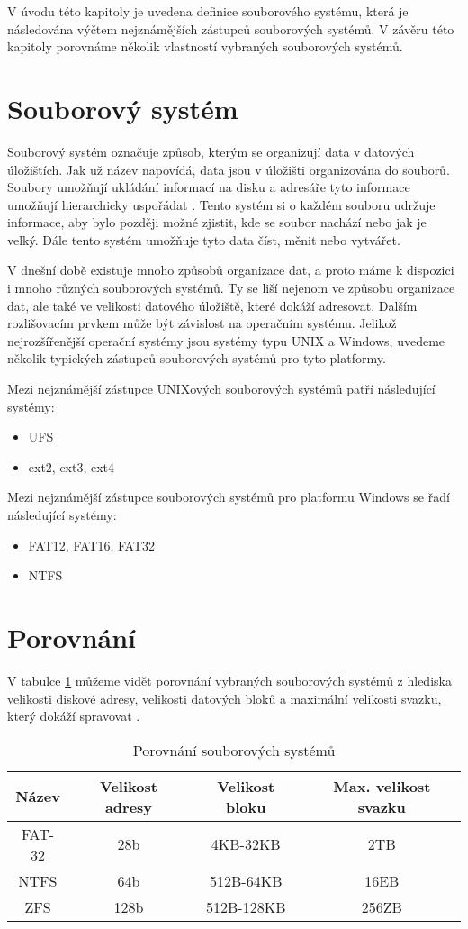 V úvodu této kapitoly je uvedena definice souborového systému, která je následována výčtem nejznámějších zástupců souborových systémů. V závěru této kapitoly porovnáme několik vlastností vybraných souborových systémů.
\section{Souborový systém}
    \label{fs}
    Souborový systém označuje způsob, kterým se organizují data v datových úložištích. Jak už název napovídá, data jsou v úložišti organizována do souborů. Soubory umožňují ukládání informací na disku a adresáře tyto informace umožňují hierarchicky uspořádat \cite{fs}. Tento systém si o každém souboru udržuje informace, aby bylo později možné zjistit, kde se soubor nachází nebo jak je velký. Dále tento systém umožňuje tyto data číst, měnit nebo vytvářet.

    V dnešní době existuje mnoho způsobů organizace dat, a proto máme k dispozici i mnoho různých souborových systémů. Ty se liší nejenom ve způsobu organizace dat,
    ale také ve velikosti datového úložiště, které dokáží adresovat. Dalším rozlišovacím prvkem může být závislost na operačním systému.
    Jelikož nejrozšířenější operační systémy jsou systémy typu UNIX a Windows, uvedeme několik typických zástupců souborových systémů pro tyto platformy.

    Mezi nejznámější zástupce UNIXových souborových systémů patří následující systémy:
    \begin{itemize}
      \item UFS
      \item ext2, ext3, ext4
    \end{itemize}

    Mezi nejznámější zástupce souborových systémů pro platformu Windows se řadí následující systémy:
    \begin{itemize}
      \item FAT12, FAT16, FAT32
      \item NTFS
    \end{itemize}

\section{Porovnání}
    V tabulce \ref{fscompare} můžeme vidět porovnání vybraných souborových systémů z hlediska velikosti diskové adresy, velikosti datových bloků a maximální velikosti svazku, který dokáží spravovat \cite{fs}.
    \begin{table}
    \centering
    \caption{Porovnání souborových systémů}
    \label{fscompare}
    \begin{tabular}{|c|c|c|c|}
    \hline
    Název & Velikost adresy & Velikost bloku & Max. velikost svazku \\ \hline
    FAT-32 & 28b & 4KB-32KB & 2TB \\ \hline
    NTFS & 64b & 512B-64KB & 16EB \\ \hline
    ZFS & 128b & 512B-128KB & 256ZB \\ \hline
    \end{tabular}
    \end{table} 